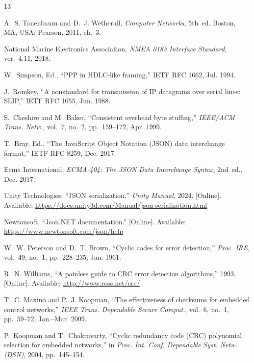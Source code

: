 \documentclass[journal]{IEEEtran}
\begin{document}
\begin{thebibliography}{13}

A.~S. Tanenbaum and D.~J. Wetherall, \emph{Computer Networks}, 5th~ed. Boston, MA, USA: Pearson, 2011, ch.~3.

National Marine Electronics Association, \emph{NMEA 0183 Interface Standard}, ver.~4.11, 2018.

W.~Simpson, Ed., ``PPP in HDLC-like framing,'' IETF RFC 1662, Jul. 1994.

J.~Romkey, ``A nonstandard for transmission of IP datagrams over serial lines: SLIP,'' IETF RFC 1055, Jun. 1988.

S.~Cheshire and M.~Baker, ``Consistent overhead byte stuffing,'' \emph{IEEE/ACM Trans. Netw.}, vol.~7, no.~2, pp.~159--172, Apr. 1999.

T.~Bray, Ed., ``The JavaScript Object Notation (JSON) data interchange format,'' IETF RFC 8259, Dec. 2017.

Ecma International, \emph{ECMA-404: The JSON Data Interchange Syntax}, 2nd~ed., Dec. 2017.

Unity Technologies, ``JSON serialization,'' \emph{Unity Manual}, 2024. [Online]. Available: \url{https://docs.unity3d.com/Manual/json-serialization.html}

Newtonsoft, ``Json.NET documentation.'' [Online]. Available: \url{https://www.newtonsoft.com/json/help}

W.~W. Peterson and D.~T. Brown, ``Cyclic codes for error detection,'' \emph{Proc. IRE}, vol.~49, no.~1, pp.~228--235, Jan. 1961.

R.~N. Williams, ``A painless guide to CRC error detection algorithms,'' 1993. [Online]. Available: \url{http://www.ross.net/crc/}

T.~C. Maxino and P.~J. Koopman, ``The effectiveness of checksums for embedded control networks,'' \emph{IEEE Trans. Dependable Secure Comput.}, vol.~6, no.~1, pp.~59--72, Jan.--Mar. 2009.

P.~Koopman and T.~Chakravarty, ``Cyclic redundancy code (CRC) polynomial selection for embedded networks,'' in \emph{Proc. Int. Conf. Dependable Syst. Netw. (DSN)}, 2004, pp.~145--154.

\end{thebibliography}

\end{document}
